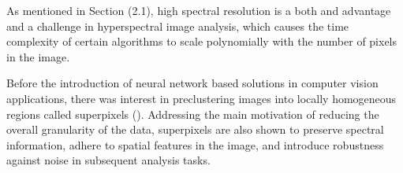 As mentioned in Section (2.1), high spectral resolution is a both and advantage and a challenge in hyperspectral image analysis, which causes the time complexity of certain algorithms to scale polynomially with the number of pixels in the image. 

Before the introduction of neural network based solutions in computer vision applications, there was interest in preclustering images into locally homogeneous regions called superpixels (\cite{SLIC}). Addressing the main motivation of reducing the overall granularity of the data, superpixels are also shown to preserve spectral information, adhere to spatial features in the image, and introduce robustness against noise in subsequent analysis tasks.

